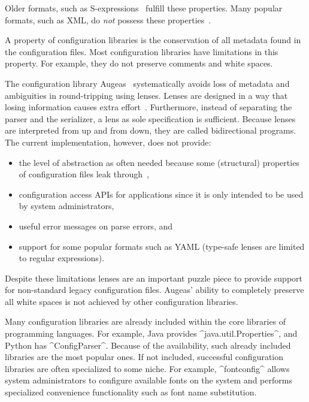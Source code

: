 Older formats, such as S-expressions~\cite{mccarthy1960recursive} fulfill these properties.
Many popular formats, such as XML, do \emph{not} possess these properties~\cite{wadler2003xml}.

A property of configuration libraries is the conservation of all metadata found in the configuration files.
Most configuration libraries have limitations in this property.
For example, they do not preserve comments and white spaces.

\label{sec:augeas}
The configuration library Augeas~\cite{lutterkort2008augeas} systematically avoids loss of metadata and ambiguities in round-tripping using lenses.
Lenses are designed in a way that losing information causes extra effort~\cite{foster2008boomerang}.
Furthermore, instead of separating the parser and the serializer, a lens as sole specification is sufficient.
Because lenses are interpreted from up and from down, they are called bidirectional programs.
The current implementation, however, does not provide:
\begin{itemize}
 \item the level of abstraction as often needed because some (structural) properties of configuration files leak through~\cite{berlakovich2016universal},
 \item configuration access APIs for applications since it is only intended to be used by system administrators,
 \item useful error messages on parse errors, and
 \item support for some popular formats such as YAML (type-safe lenses are limited to regular expressions).
\end{itemize}
Despite these limitations lenses are an important puzzle piece to provide support for non-standard legacy configuration files.
Augeas' ability to completely preserve all white spaces is not achieved by other configuration libraries.

Many configuration libraries are already included within the core libraries of programming languages.
For example, Java provides ^java.util.Properties^, and Python has ^ConfigParser^.
Because of the availability, such already included libraries are the most popular ones.
If not included, successful configuration libraries are often specialized to some niche.
For example, ^fontconfig^ allows system administrators to configure available fonts on the system and performs specialized convenience functionality such as font name substitution.

